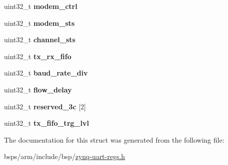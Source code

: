\begin{DoxyCompactItemize}
uint32\+\_\+t {\bfseries modem\+\_\+ctrl}
\item 
\mbox{\label{structzynq__uart_ae84d6d1f8316c46e29fd3ba53db65420}} 
uint32\+\_\+t {\bfseries modem\+\_\+sts}
\item 
\mbox{\label{structzynq__uart_a6cdb866e91981c78e8fd6c0079d66d82}} 
uint32\+\_\+t {\bfseries channel\+\_\+sts}
\item 
\mbox{\label{structzynq__uart_a933063c537b42e421c20c13b65f62e95}} 
uint32\+\_\+t {\bfseries tx\+\_\+rx\+\_\+fifo}
\item 
\mbox{\label{structzynq__uart_a1a3ca4a1d869a524e9f90a5a228a2397}} 
uint32\+\_\+t {\bfseries baud\+\_\+rate\+\_\+div}
\item 
\mbox{\label{structzynq__uart_a9ae493a1bc93a35c2aef39bcbeaeda9e}} 
uint32\+\_\+t {\bfseries flow\+\_\+delay}
\item 
\mbox{\label{structzynq__uart_aa80e21b8a3883e65de837236971ae7eb}} 
uint32\+\_\+t {\bfseries reserved\+\_\+3c} \mbox{[}2\mbox{]}
\item 
\mbox{\label{structzynq__uart_ac449180bc59f01c4a9c10054c7527126}} 
uint32\+\_\+t {\bfseries tx\+\_\+fifo\+\_\+trg\+\_\+lvl}
\end{DoxyCompactItemize}


The documentation for this struct was generated from the following file\+:\begin{DoxyCompactItemize}
\item 
bsps/arm/include/bsp/\mbox{\hyperlink{zynq-uart-regs_8h}{zynq-\/uart-\/regs.\+h}}\end{DoxyCompactItemize}
